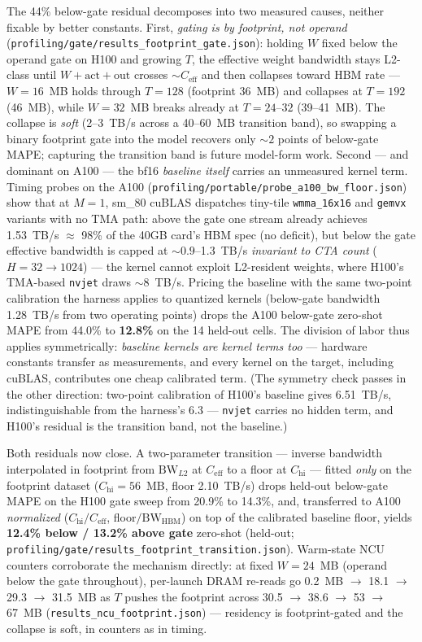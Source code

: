 \documentclass[10pt,twocolumn]{article}
\begin{document}
The 44\% below-gate residual decomposes into two measured causes, neither fixable by better constants.  First, \emph{gating is by footprint, not operand} (\texttt{profiling/gate/results\_footprint\_gate.json}): holding $W$ fixed below the operand gate on H100 and growing $T$, the effective weight bandwidth stays L2-class until $W + \text{act} + \text{out}$ crosses ${\sim}C_\text{eff}$ and then collapses toward HBM rate --- $W{=}16$~MB holds through $T{=}128$ (footprint 36~MB) and collapses at $T{=}192$ (46~MB), while $W{=}32$~MB breaks already at $T{=}24$--$32$ (39--41~MB).  The collapse is \emph{soft} (2--3~TB/s across a 40--60~MB transition band), so swapping a binary footprint gate into the model recovers only ${\sim}2$ points of below-gate MAPE; capturing the transition band is future model-form work.  Second --- and dominant on A100 --- the bf16 \emph{baseline itself} carries an unmeasured kernel term.  Timing probes on the A100 (\texttt{profiling/portable/probe\_a100\_bw\_floor.json}) show that at $M{=}1$, sm\_80 cuBLAS dispatches tiny-tile \texttt{wmma\_16x16} and \texttt{gemvx} variants with no TMA path: above the gate one stream already achieves 1.53~TB/s ${\approx}$ 98\% of the 40GB card's HBM spec (no deficit), but below the gate effective bandwidth is capped at ${\sim}0.9$--1.3~TB/s \emph{invariant to CTA count} ($H{=}32\!\to\!1024$) --- the kernel cannot exploit L2-resident weights, where H100's TMA-based \texttt{nvjet} draws ${\sim}8$~TB/s.  Pricing the baseline with the same two-point calibration the harness applies to quantized kernels (below-gate bandwidth 1.28~TB/s from two operating points) drops the A100 below-gate zero-shot MAPE from 44.0\% to \textbf{12.8\%} on the 14 held-out cells.  The division of labor thus applies symmetrically: \emph{baseline kernels are kernel terms too} --- hardware constants transfer as measurements, and every kernel on the target, including cuBLAS, contributes one cheap calibrated term.  (The symmetry check passes in the other direction: two-point calibration of H100's baseline gives 6.51~TB/s, indistinguishable from the harness's 6.3 --- \texttt{nvjet} carries no hidden term, and H100's residual is the transition band, not the baseline.)

Both residuals now close.  A two-parameter transition --- inverse bandwidth interpolated in footprint from $\mathrm{BW}_{L2}$ at $C_\text{eff}$ to a floor at $C_\text{hi}$ --- fitted \emph{only} on the footprint dataset ($C_\text{hi}=56$~MB, floor 2.10~TB/s) drops held-out below-gate MAPE on the H100 gate sweep from 20.9\% to 14.3\%, and, transferred to A100 \emph{normalized} ($C_\text{hi}/C_\text{eff}$, floor$/\mathrm{BW}_\text{HBM}$) on top of the calibrated baseline floor, yields \textbf{12.4\% below / 13.2\% above gate} zero-shot (held-out; \texttt{profiling/gate/results\_footprint\_transition.json}).  Warm-state NCU counters corroborate the mechanism directly: at fixed $W{=}24$~MB (operand below the gate throughout), per-launch DRAM re-reads go 0.2~MB $\to$ 18.1 $\to$ 29.3 $\to$ 31.5~MB as $T$ pushes the footprint across 30.5 $\to$ 38.6 $\to$ 53 $\to$ 67~MB (\texttt{results\_ncu\_footprint.json}) --- residency is footprint-gated and the collapse is soft, in counters as in timing.
\end{document}
